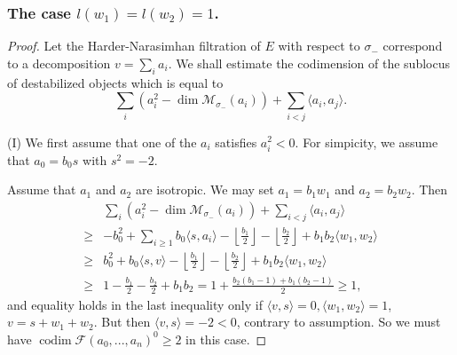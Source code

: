 \documentclass[leqno,11pt]{amsart}
\def\codim{\mathop{\mathrm{codim}}\nolimits}
\def\dim{\mathop{\mathrm{dim}}\nolimits}
\theoremstyle{definition}
\def\FF{\ensuremath{\mathcal F}}
\def\MM{\ensuremath{\mathcal M}}
\begin{document}
\subsubsection{The case $l(w_1)=l(w_2)=1$.}
\begin{proof}  Let the Harder-Narasimhan filtration of $E$ with respect to $\sigma_-$ correspond to a decomposition $v=\sum_i a_i$.  We shall estimate the codimension of the sublocus of destabilized objects which is equal to
 \begin{equation}
\sum_i (a_i^2-\dim \MM_{\sigma_-}(a_i))+\sum_{i<j}\langle a_i,a_j \rangle.
\end{equation}


(I) We first assume that one of the $a_i$ satisfies $a_i^2<0$.
For simpicity, we assume that $a_0=b_0 s$ with $s^2=-2$.

Assume that $a_1$ and $a_2$ are isotropic.
We may set $a_1=b_1 w_1$ and $a_2=b_2 w_2$.
Then 
 \begin{equation}\label{eq: spherical 1,1 case I}
\begin{split}
& \sum_i (a_i^2-\dim \MM_{\sigma_-}(a_i))+\sum_{i<j}\langle a_i,a_j \rangle\\
\geq & -b_0^2+\sum_{i \geq 1}b_0 \langle s,a_i \rangle
-\left\lfloor\frac{b_1}{2}\right\rfloor-\left\lfloor\frac{b_2}{2}\right\rfloor+b_1 b_2 \langle w_1,w_2 \rangle\\
\geq & b_0^2+b_0 \langle s,v \rangle-\left\lfloor\frac{b_1}{2}\right\rfloor-\left\lfloor\frac{b_2}{2}\right\rfloor+b_1 b_2 \langle w_1,w_2 \rangle\\
\geq & 1-\frac{b_1}{2}-\frac{b_2}{2}+b_1 b_2=1+\frac{b_2(b_1-1)+b_1(b_2-1)}{2} \geq 1,
\end{split}
\end{equation} 
 and equality holds in the last inequality only if $\langle v, s\rangle=0,\langle w_1,w_2\rangle=1$, $v=s+w_1+w_2$.  But then $\langle v,s\rangle=-2<0$, contrary to assumption.  So we must have $\codim\FF(a_0,...,a_n)^0\geq 2$ in this case.
 


\end{proof}
\end{document}
